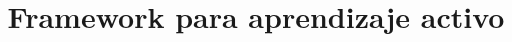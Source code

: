 \documentclass[12pt,twosided]{book}
\begin{document}









\title{Framework para aprendizaje activo} %
\end{document}
